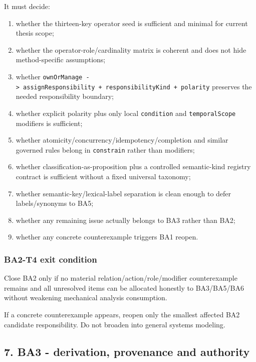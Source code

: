 \documentclass[
  10pt,
  a4paper,
]{article}
\providecommand{\tightlist}{%
  \setlength{\itemsep}{0pt}\setlength{\parskip}{0pt}}
\begin{document}
It must decide:

\begin{enumerate}
\def\labelenumi{\arabic{enumi}.}
\tightlist
\item
  whether the thirteen-key operator seed is sufficient and minimal for
  current thesis scope;
\item
  whether the operator-role/cardinality matrix is coherent and does not
  hide method-specific assumptions;
\item
  whether
  \texttt{ownOrManage\ -\textgreater{}\ assignResponsibility\ +\ responsibilityKind\ +\ polarity}
  preserves the needed responsibility boundary;
\item
  whether explicit polarity plus only local \texttt{condition} and
  \texttt{temporalScope} modifiers is sufficient;
\item
  whether atomicity/concurrency/idempotency/completion and similar
  governed rules belong in \texttt{constrain} rather than modifiers;
\item
  whether classification-as-proposition plus a controlled semantic-kind
  registry contract is sufficient without a fixed universal taxonomy;
\item
  whether semantic-key/lexical-label separation is clean enough to defer
  labels/synonyms to BA5;
\item
  whether any remaining issue actually belongs to BA3 rather than BA2;
\item
  whether any concrete counterexample triggers BA1 reopen.
\end{enumerate}

\subsubsection{BA2-T4 exit condition}\label{ba2-t4-exit-condition}

Close BA2 only if no material relation/action/role/modifier
counterexample remains and all unresolved items can be allocated
honestly to BA3/BA5/BA6 without weakening mechanical analysis
consumption.

If a concrete counterexample appears, reopen only the smallest affected
BA2 candidate responsibility. Do not broaden into general systems
modeling.

\subsection{7. BA3 - derivation, provenance and
authority}\label{7-ba3---derivation-provenance-and-authority}
\end{document}
